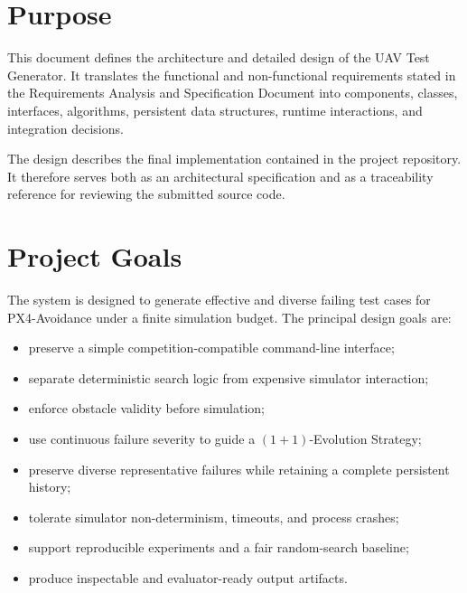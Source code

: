 \documentclass[11pt,a4paper,openany]{report}
\newcommand{\systemname}{UAV Test Generator}
\begin{document}
\section{Purpose}
This document defines the architecture and detailed design of the \systemname. It translates the functional and non-functional requirements stated in the Requirements Analysis and Specification Document into components, classes, interfaces, algorithms, persistent data structures, runtime interactions, and integration decisions.

The design describes the final implementation contained in the project repository. It therefore serves both as an architectural specification and as a traceability reference for reviewing the submitted source code.

\section{Project Goals}
The system is designed to generate effective and diverse failing test cases for PX4-Avoidance under a finite simulation budget. The principal design goals are:
\begin{itemize}
  \item preserve a simple competition-compatible command-line interface;
  \item separate deterministic search logic from expensive simulator interaction;
  \item enforce obstacle validity before simulation;
  \item use continuous failure severity to guide a $(1+1)$-Evolution Strategy;
  \item preserve diverse representative failures while retaining a complete persistent history;
  \item tolerate simulator non-determinism, timeouts, and process crashes;
  \item support reproducible experiments and a fair random-search baseline;
  \item produce inspectable and evaluator-ready output artifacts.
\end{itemize}
\end{document}
